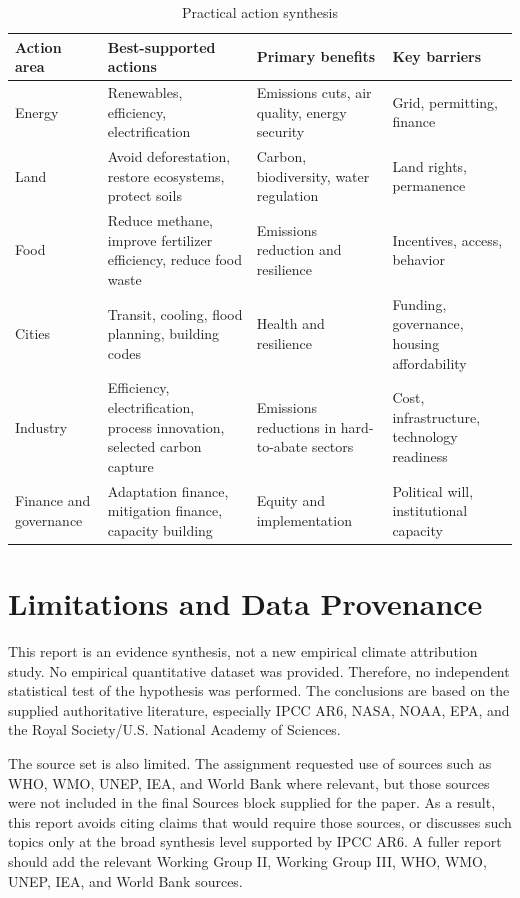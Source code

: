 \documentclass[12pt]{article}
\begin{document}
\begin{table}[htbp]
\centering
\caption{Practical action synthesis}
\begin{tabularx}{\textwidth}{p{2.6cm}Y Y Y}
\toprule
Action area & Best-supported actions & Primary benefits & Key barriers \\
\midrule
Energy & Renewables, efficiency, electrification & Emissions cuts, air quality, energy security & Grid, permitting, finance \\
Land & Avoid deforestation, restore ecosystems, protect soils & Carbon, biodiversity, water regulation & Land rights, permanence \\
Food & Reduce methane, improve fertilizer efficiency, reduce food waste & Emissions reduction and resilience & Incentives, access, behavior \\
Cities & Transit, cooling, flood planning, building codes & Health and resilience & Funding, governance, housing affordability \\
Industry & Efficiency, electrification, process innovation, selected carbon capture & Emissions reductions in hard-to-abate sectors & Cost, infrastructure, technology readiness \\
Finance and governance & Adaptation finance, mitigation finance, capacity building & Equity and implementation & Political will, institutional capacity \\
\bottomrule
\end{tabularx}
\end{table}

\section{Limitations and Data Provenance}

This report is an evidence synthesis, not a new empirical climate attribution study. No empirical quantitative dataset was provided. Therefore, no independent statistical test of the hypothesis was performed. The conclusions are based on the supplied authoritative literature, especially IPCC AR6, NASA, NOAA, EPA, and the Royal Society/U.S. National Academy of Sciences.

The source set is also limited. The assignment requested use of sources such as WHO, WMO, UNEP, IEA, and World Bank where relevant, but those sources were not included in the final Sources block supplied for the paper. As a result, this report avoids citing claims that would require those sources, or discusses such topics only at the broad synthesis level supported by IPCC AR6. A fuller report should add the relevant Working Group II, Working Group III, WHO, WMO, UNEP, IEA, and World Bank sources.
\end{document}
